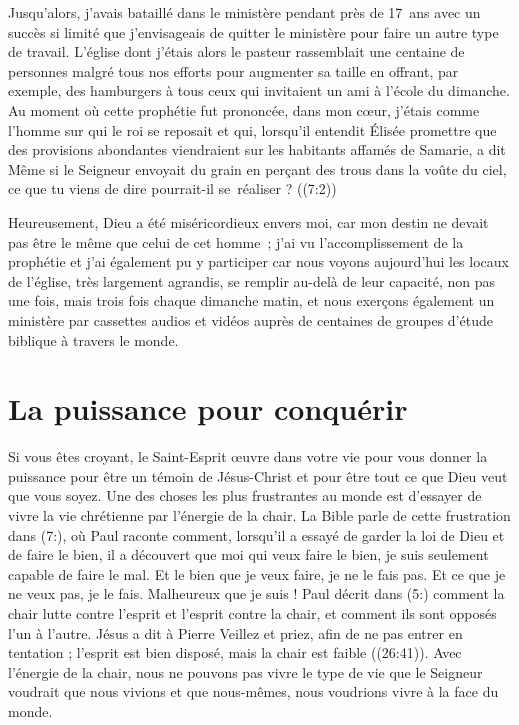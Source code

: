 Jusqu'alors, j'avais bataillé dans le ministère pendant près de 17~ans
 avec un succès si limité que j'envisageais de quitter le ministère
 pour faire un autre type de travail.
 L'église dont j'étais alors le pasteur rassemblait une centaine de personnes
 malgré tous nos efforts pour augmenter sa taille en offrant, par exemple, des hamburgers
 à tous ceux qui invitaient un ami à l'école du dimanche.
 Au moment où cette prophétie fut prononcée, dans mon cœur, j'étais comme l'homme
 sur qui le roi se reposait et qui, lorsqu'il entendit Élisée promettre
 que des provisions abondantes viendraient sur les habitants affamés
 de Samarie, a dit\frcolon{}
 \Og Même si le Seigneur envoyait du grain en perçant des trous dans
 la voûte du ciel, ce que tu viens de dire pourrait-il se~réaliser ? \Fg{}
 ((7:2))

Heureusement, Dieu a été miséricordieux envers moi,
 car mon destin ne devait pas être le même que celui de cet homme~;
 j'ai vu l'ac\-com\-plis\-sement de la prophétie et j'ai également pu y participer
 car nous voyons aujourd'hui les locaux de l'église, très largement agrandis,
 se remplir au-delà de leur capacité, non pas une fois, mais trois fois
 chaque dimanche matin, et nous exerçons également un ministère
 par cassettes audios et vidéos auprès de centaines de groupes
 d'étude biblique à travers le monde.

\section{La puissance pour conqu\'erir}

Si vous êtes croyant, le Saint-Esprit œuvre dans votre vie pour vous donner
 la puissance pour être un témoin de Jésus-Christ et pour être tout
 ce que Dieu veut que vous soyez.
 Une des choses les plus frustrantes au monde est d'essayer
 de vivre la vie chrétienne par l'énergie de la chair.
 La Bible parle de cette frustration dans (7:),
 où Paul raconte comment, lors\-qu'il a essayé de garder la loi de Dieu
 et de faire le bien, il a découvert que \Og moi qui veux faire le bien,
 je suis seulement capable de faire le mal. Et le bien que je veux faire,
 je ne le fais pas. Et ce que je ne veux pas, je le fais.
 Malheureux que je suis ! \Fg{}
 Paul décrit dans (5:) comment la chair lutte contre l'esprit
 et l'esprit contre la chair, et comment ils sont opposés l'un à l'autre.
 Jésus a dit à Pierre\frcolon{}
 \Og Veillez et priez, afin de ne pas entrer en tentation ;
 l'esprit est bien disposé, mais la chair est faible \Fg{}
 ((26:41)).
 Avec l'énergie de la chair, nous ne pouvons pas vivre
 le type de vie que le Seigneur voudrait que nous vivions
 et que nous-mêmes, nous voudrions vivre à la face du monde.

